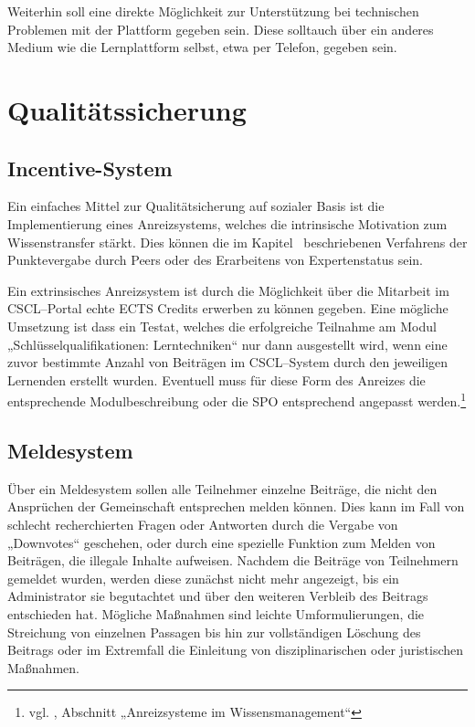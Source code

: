  Weiterhin soll eine direkte Möglichkeit zur Unterstützung bei technischen Problemen mit der Plattform gegeben sein. Diese solltauch über ein anderes Medium wie die Lernplattform selbst, etwa per Telefon, gegeben sein.


\newpage
\section{Qualitätssicherung} %
\label{sec:qualitatssicherung}

\subsection{Incentive-System} %
\label{sub:incentive_system}
Ein einfaches Mittel zur Qualitätsicherung auf sozialer Basis ist die Implementierung eines Anreizsystems, welches die intrinsische Motivation zum Wissenstransfer stärkt. Dies können die im Kapitel~ beschriebenen Verfahrens der Punktevergabe durch Peers oder des Erarbeitens von Expertenstatus sein.

Ein extrinsisches Anreizsystem ist durch die Möglichkeit über die Mitarbeit im \ac{CSCL}–Portal echte \ac{ECTS} Credits erwerben zu können gegeben. Eine mögliche Umsetzung ist dass ein Testat, welches die erfolgreiche Teilnahme am Modul „Schlüsselqualifikationen: Lerntechniken“ nur dann ausgestellt wird, wenn eine zuvor bestimmte Anzahl von Beiträgen im \ac{CSCL}–System durch den jeweiligen Lernenden erstellt wurden. Eventuell muss für diese Form des Anreizes die entsprechende Modulbeschreibung oder die \ac{SPO} entsprechend angepasst werden.\footnote{vgl. \cite{beuth:anreiz}, Abschnitt „Anreizsysteme im Wissensmanagement“}

\subsection{Meldesystem} %
\label{sub:meldesystem}
Über ein Meldesystem sollen alle Teilnehmer einzelne Beiträge, die nicht den Ansprüchen der Gemeinschaft entsprechen melden können. Dies kann im Fall von schlecht recherchierten Fragen oder Antworten durch die Vergabe von „Downvotes“ geschehen, oder durch eine spezielle Funktion zum Melden von Beiträgen, die illegale Inhalte aufweisen. Nachdem die Beiträge von Teilnehmern gemeldet wurden, werden diese zunächst nicht mehr angezeigt, bis ein Administrator sie begutachtet und über den weiteren Verbleib des Beitrags entschieden hat. Mögliche Maßnahmen sind leichte Umformulierungen, die Streichung von einzelnen Passagen bis hin zur vollständigen Löschung des Beitrags oder im Extremfall die Einleitung von disziplinarischen oder juristischen Maßnahmen.

